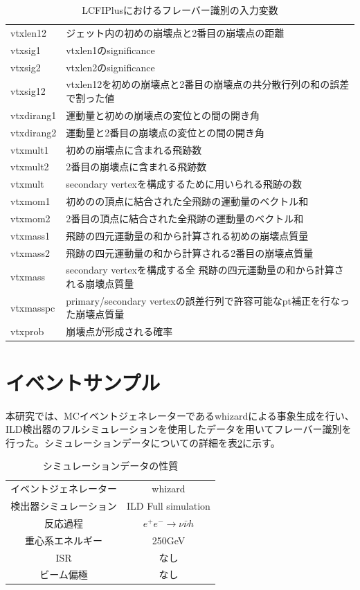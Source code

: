\begin{table}[H]
\begin{tabular}{ l | l }
   vtxlen12 & ジェット内の初めの崩壊点と2番目の崩壊点の距離\\
   vtxsig1 & vtxlen1のsignificance\\
   vtxsig2 & vtxlen2のsignificance\\
   vtxsig12 & vtxlen12を初めの崩壊点と2番目の崩壊点の共分散行列の和の誤差で割った値\\
   vtxdirang1 & 運動量と初めの崩壊点の変位との間の開き角\\
   vtxdirang2 & 運動量と2番目の崩壊点の変位との間の開き角\\
   vtxmult1 & 初めの崩壊点に含まれる飛跡数\\
   vtxmult2 & 2番目の崩壊点に含まれる飛跡数\\
   vtxmult & secondary vertexを構成するために用いられる飛跡の数\\
   vtxmom1 & 初めのの頂点に結合された全飛跡の運動量のベクトル和\\
   vtxmom2 & 2番目の頂点に結合された全飛跡の運動量のベクトル和\\
   vtxmass1 & 飛跡の四元運動量の和から計算される初めの崩壊点質量\\
   vtxmass2 & 飛跡の四元運動量の和から計算される2番目の崩壊点質量\\
   vtxmass & secondary vertexを構成する全 飛跡の四元運動量の和から計算される崩壊点質量\\
   vtxmasspc & primary/secondary vertexの誤差行列で許容可能なpt補正を行なった崩壊点質量\\
   vtxprob & 崩壊点が形成される確率\\
   \hline
  \end{tabular}
  \caption{LCFIPlusにおけるフレーバー識別の入力変数}
 \label{lcfiplusin}
\end{table}
\section{イベントサンプル}
本研究では、MCイベントジェネレーターであるwhizardによる事象生成を行い、ILD検出器のフルシミュレーションを使用したデータを用いてフレーバー識別を行った。シミュレーションデータについての詳細を表\ref{data}に示す。
\begin{table}[H]
 \centering
 \begin{tabular}{ c c }
 \hline
 イベントジェネレーター & whizard\\
 検出器シミュレーション & ILD Full simulation\\
 反応過程 & $e^+e^- \rightarrow \nu \bar{\nu} h$\\
 重心系エネルギー & 250GeV\\
 ISR & なし\\
 ビーム偏極 & なし\\
 \hline
 \end{tabular}
 \label{data}
 \caption{シミュレーションデータの性質}
\end{table}

